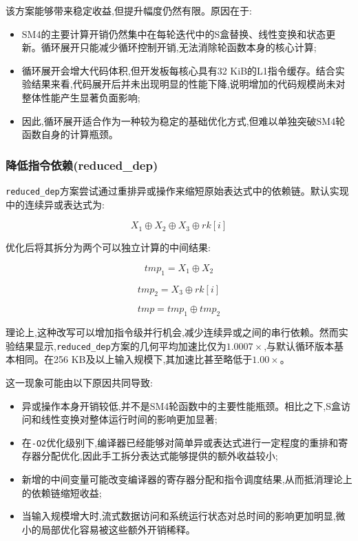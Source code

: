 该方案能够带来稳定收益,但提升幅度仍然有限。原因在于:

\begin{itemize}
    \item SM4的主要计算开销仍然集中在每轮迭代中的S盒替换、线性变换和状态更新。循环展开只能减少循环控制开销,无法消除轮函数本身的核心计算;
    \item 循环展开会增大代码体积,但开发板每核心具有32 KiB的L1指令缓存。结合实验结果来看,代码展开后并未出现明显的性能下降,说明增加的代码规模尚未对整体性能产生显著负面影响;
    \item 因此,循环展开适合作为一种较为稳定的基础优化方式,但难以单独突破SM4轮函数自身的计算瓶颈。
\end{itemize}

\subsubsection{降低指令依赖(reduced\_dep)}

\texttt{reduced\_dep}方案尝试通过重排异或操作来缩短原始表达式中的依赖链。默认实现中的连续异或表达式为:

\[X_1 \oplus X_2 \oplus X_3 \oplus rk[i]\]

优化后将其拆分为两个可以独立计算的中间结果:

\[tmp_1 = X_1 \oplus X_2\]

\[tmp_2 = X_3 \oplus rk[i]\]

\[tmp = tmp_1 \oplus tmp_2\]

理论上,这种改写可以增加指令级并行机会,减少连续异或之间的串行依赖。然而实验结果显示,\texttt{reduced\_dep}方案的几何平均加速比仅为$1.0007\times$,与默认循环版本基本相同。在256 KB及以上输入规模下,其加速比甚至略低于$1.00\times$。

这一现象可能由以下原因共同导致:

\begin{itemize}
    \item 异或操作本身开销较低,并不是SM4轮函数中的主要性能瓶颈。相比之下,S盒访问和线性变换对整体运行时间的影响更加显著;
    \item 在\texttt{-O2}优化级别下,编译器已经能够对简单异或表达式进行一定程度的重排和寄存器分配优化,因此手工拆分表达式能够提供的额外收益较小;
    \item 新增的中间变量可能改变编译器的寄存器分配和指令调度结果,从而抵消理论上的依赖链缩短收益;
    \item 当输入规模增大时,流式数据访问和系统运行状态对总时间的影响更加明显,微小的局部优化容易被这些额外开销稀释。
\end{itemize}

